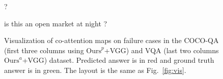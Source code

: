 \documentclass{article}
\def \fsize {1pt}
\begin{document}
\begin{figure}[tp]
\begin{minipage}{0.19\linewidth}
\begin{center}
{\textcolor[rgb]{1.0000,0.8141,0.0000}{?}
}
\end{center}
\end{minipage}
\begin{minipage}{0.19\linewidth}
\begin{center}
\tiny{
\setlength{\fboxsep}{\fsize}
\textcolor[rgb]{0.0000,0.0000,0.5713}{is}
\textcolor[rgb]{0.0000,0.0000,0.5713}{this}
\textcolor[rgb]{0.0000,0.0000,0.5891}{an}
\textcolor[rgb]{0.0000,0.0000,0.6961}{open}
\textcolor[rgb]{0.0000,0.2686,1.0000}{market}
\textcolor[rgb]{0.0095,0.9118,0.9583}{at}
\textcolor[rgb]{0.6799,1.0000,0.2878}{night}
\textcolor[rgb]{1.0000,0.6979,0.0000}{?}
}
\end{center}   
\end{minipage}
\caption{Visualization of co-attention maps on failure cases in the COCO-QA (first three columns using $\mathrm{Ours}^p$+VGG) and VQA (last two columns $\mathrm{Ours}^a$+VGG) dataset. Predicted answer is in red and ground truth answer is in green. The layout is the same as Fig.~\ref{fig:vis}.}
\label{fig:vis3}
\end{figure} {\small


}
\end{document}
